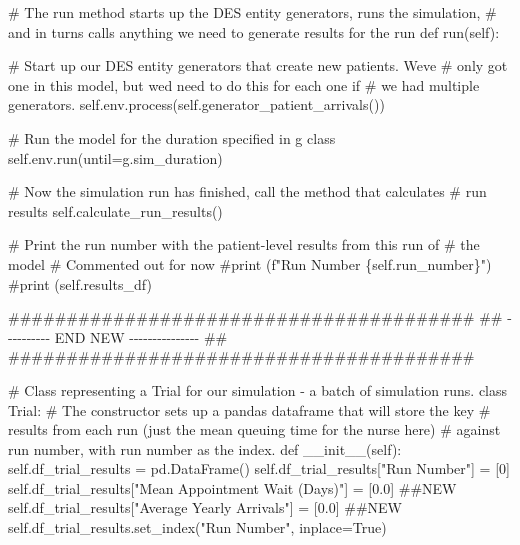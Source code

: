 \documentclass[
  letterpaper,
  DIV=11,
  numbers=noendperiod]{scrreprt}
\newenvironment{Shaded}{\begin{snugshade}}{\end{snugshade}}
\newcommand{\CommentTok}[1]{\textcolor[rgb]{0.37,0.37,0.37}{#1}}
\newcommand{\DecValTok}[1]{\textcolor[rgb]{0.68,0.00,0.00}{#1}}
\newcommand{\FloatTok}[1]{\textcolor[rgb]{0.68,0.00,0.00}{#1}}
\newcommand{\FunctionTok}[1]{\textcolor[rgb]{0.28,0.35,0.67}{#1}}
\newcommand{\KeywordTok}[1]{\textcolor[rgb]{0.00,0.23,0.31}{#1}}
\newcommand{\NormalTok}[1]{\textcolor[rgb]{0.00,0.23,0.31}{#1}}
\newcommand{\OperatorTok}[1]{\textcolor[rgb]{0.37,0.37,0.37}{#1}}
\newcommand{\RegionMarkerTok}[1]{\textcolor[rgb]{0.00,0.23,0.31}{#1}}
\newcommand{\StringTok}[1]{\textcolor[rgb]{0.13,0.47,0.30}{#1}}
\newcommand{\VariableTok}[1]{\textcolor[rgb]{0.07,0.07,0.07}{#1}}
\begin{document}
\begin{tcolorbox}
\begin{Shaded}
\begin{Highlighting}[]
    \CommentTok{\# The run method starts up the DES entity generators, runs the simulation,}
    \CommentTok{\# and in turns calls anything we need to generate results for the run}
    \KeywordTok{def}\NormalTok{ run(}\VariableTok{self}\NormalTok{):}

        \CommentTok{\# Start up our DES entity generators that create new patients.  We\textquotesingle{}ve}
        \CommentTok{\# only got one in this model, but we\textquotesingle{}d need to do this for each one if}
        \CommentTok{\# we had multiple generators.}
        \VariableTok{self}\NormalTok{.env.process(}\VariableTok{self}\NormalTok{.generator\_patient\_arrivals())}

        \CommentTok{\# Run the model for the duration specified in g class}
        \VariableTok{self}\NormalTok{.env.run(until}\OperatorTok{=}\NormalTok{g.sim\_duration)}

        \CommentTok{\# Now the simulation run has finished, call the method that calculates}
        \CommentTok{\# run results}
        \VariableTok{self}\NormalTok{.calculate\_run\_results()}

        \CommentTok{\# Print the run number with the patient{-}level results from this run of}
        \CommentTok{\# the model}
        \CommentTok{\# Commented out for now}
        \CommentTok{\#print (f"Run Number \{self.run\_number\}")}
        \CommentTok{\#print (self.results\_df)}

    \CommentTok{\#\#\#\#\#\#\#\#\#\#\#\#\#\#\#\#\#\#\#\#\#\#\#\#\#\#\#\#\#\#\#\#\#\#\#\#\#\#\#\#}
    \CommentTok{\#\# {-}{-}{-}{-}{-}{-}{-}{-}{-}{-} }\RegionMarkerTok{END}\CommentTok{ NEW {-}{-}{-}{-}{-}{-}{-}{-}{-}{-}{-}{-}{-}{-}{-} \#\#}
    \CommentTok{\#\#\#\#\#\#\#\#\#\#\#\#\#\#\#\#\#\#\#\#\#\#\#\#\#\#\#\#\#\#\#\#\#\#\#\#\#\#\#\#}

\CommentTok{\# Class representing a Trial for our simulation {-} a batch of simulation runs.}
\KeywordTok{class}\NormalTok{ Trial:}
    \CommentTok{\# The constructor sets up a pandas dataframe that will store the key}
    \CommentTok{\# results from each run (just the mean queuing time for the nurse here)}
    \CommentTok{\# against run number, with run number as the index.}
    \KeywordTok{def}  \FunctionTok{\_\_init\_\_}\NormalTok{(}\VariableTok{self}\NormalTok{):}
        \VariableTok{self}\NormalTok{.df\_trial\_results }\OperatorTok{=}\NormalTok{ pd.DataFrame()}
        \VariableTok{self}\NormalTok{.df\_trial\_results[}\StringTok{"Run Number"}\NormalTok{] }\OperatorTok{=}\NormalTok{ [}\DecValTok{0}\NormalTok{]}
        \VariableTok{self}\NormalTok{.df\_trial\_results[}\StringTok{"Mean Appointment Wait (Days)"}\NormalTok{] }\OperatorTok{=}\NormalTok{ [}\FloatTok{0.0}\NormalTok{] }\CommentTok{\#\#NEW}
        \VariableTok{self}\NormalTok{.df\_trial\_results[}\StringTok{"Average Yearly Arrivals"}\NormalTok{] }\OperatorTok{=}\NormalTok{ [}\FloatTok{0.0}\NormalTok{] }\CommentTok{\#\#NEW}
        \VariableTok{self}\NormalTok{.df\_trial\_results.set\_index(}\StringTok{"Run Number"}\NormalTok{, inplace}\OperatorTok{=}\VariableTok{True}\NormalTok{)}


\end{Highlighting}
\end{Shaded}
\end{tcolorbox}
\end{document}
